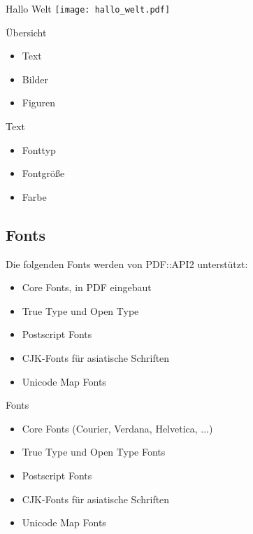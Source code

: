 \begin{frame}{Hallo Welt}
\texttt{[image: hallo\_welt.pdf]}
\end{frame}


\begin{frame}{Übersicht}
\begin{itemize}
\item Text
\item Bilder
\item Figuren
\end{itemize}
\end{frame}

\begin{frame}{Text}
\begin{itemize}
\item Fonttyp
\item Fontgröße
\item Farbe
\end{itemize}
\end{frame}

\subsection{Fonts}

Die folgenden Fonts werden von PDF::API2
unterstützt:


\begin{itemize}
\item Core Fonts, in PDF eingebaut
\item True Type und Open Type
\item Postscript Fonts
\item CJK-Fonts für asiatische Schriften
\item Unicode Map Fonts
\end{itemize}

\begin{frame}{Fonts}
\begin{itemize}
\item Core Fonts (Courier, Verdana, Helvetica, ...)
\item True Type und Open Type Fonts
\item Postscript Fonts
\item CJK-Fonts für asiatische Schriften
\item Unicode Map Fonts
\end{itemize}
\end{frame}

